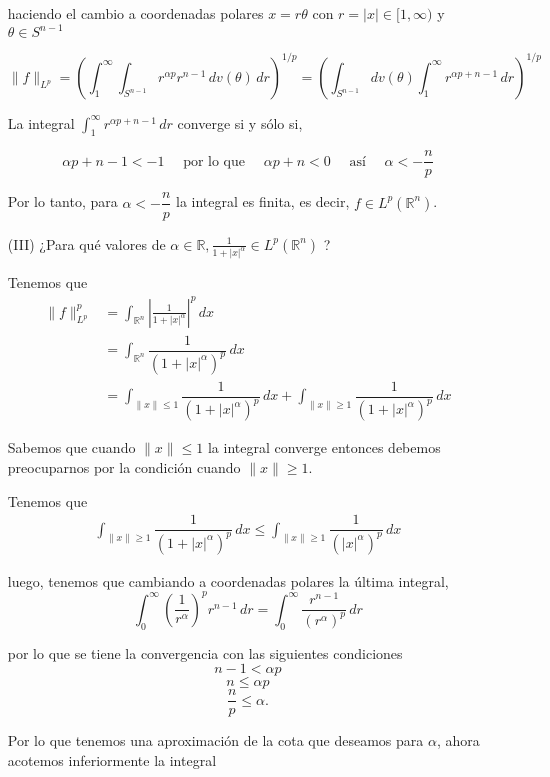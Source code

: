 \begin{itemize}
\begin{sol}
haciendo el cambio a coordenadas polares \( x = r\theta \) con \( r = |x| \in [1, \infty) \) y \( \theta \in S^{n-1} \)

\[\| f \|_{L^p} =\left( \int_1^\infty \int_{S^{n-1}} r^{\alpha p} r^{n-1} \, dv(\theta) \, dr \right)^{1/p} = \left( \int_{S^{n-1}} dv(\theta) \int_1^\infty r^{\alpha p + n - 1} \, dr \right)^{1/p}
\]

La integral \( \int_1^\infty r^{\alpha p + n - 1} \, dr \) converge si y sólo si,

\[
\alpha p + n - 1 < -1 \quad \text{ por lo que } \quad \alpha p + n < 0 \quad \text{ así }\quad \alpha < -\frac{n}{p}
\]

Por lo tanto, para \( \alpha < -\dfrac{n}{p} \) la integral es finita, es decir, \( f \in L^p(\mathbb{R}^n) \).
\end{sol}

\item[(III)] ¿Para qué valores de $\alpha \in \mathbb{R}, \frac{1}{1+|x|^\alpha} \in L^p\left(\mathbb{R}^n\right)$ ?
\begin{sol}
Tenemos que 
\begin{align*}
  \| f \|_{L^p}^{p} &= \int_{\mathbb{R}^n} \left|\frac{1}{1 + |x|^\alpha}\right|^{p}\, dx \\
   &= \int_{\mathbb{R}^n} \dfrac{1}{(1 + |x|^\alpha)^p} \, dx \\
   &= \int_{\|x\|\leq 1} \dfrac{1}{(1 + |x|^\alpha)^p} \, dx + \int_{\|x\|\geq 1} \dfrac{1}{(1 + |x|^\alpha)^p} \, dx
\end{align*}

Sabemos que cuando $\|x\|\leq 1$ la integral converge entonces debemos preocuparnos por la condición cuando $\|x\| \geq 1$.

Tenemos que 
\begin{align*}
  \int_{\|x\|\geq 1} \dfrac{1}{(1 + |x|^\alpha)^p} \, dx \leq  \int_{\|x\|\geq 1} \dfrac{1}{(|x|^\alpha)^p} \, dx
\end{align*}

luego, tenemos que cambiando a coordenadas polares la última integral,
\[ 
 \int_{0}^{\infty} \left( \frac{1}{r^{\alpha}} \right)^{p} r^{n-1} \, dr = \int_{0}^{\infty} \frac{r^{n-1}}{(r^{\alpha})^{p}} \, dr 
\]

por lo que se tiene la convergencia con las siguientes condiciones
\[ 
n - 1 < \alpha p 
\]
\[ 
n \leq \alpha p 
\]
\[ 
\frac{n}{p} \leq \alpha. 
\]

Por lo que tenemos una aproximación de la cota que deseamos para $\alpha$, ahora acotemos inferiormente la integral


\end{sol}
\end{itemize}
